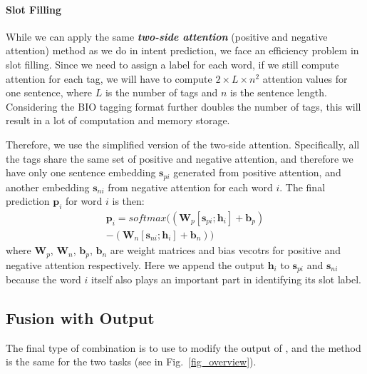 \paragraph{Slot Filling}
While we can apply the same \textbf{\emph{two-side attention}} (positive and negative attention) method as we do in intent prediction, we face an efficiency problem in slot filling. Since we need to assign a label for each word, if we still compute attention for each tag, we will have to compute $2\times L \times n^2$ attention values for one sentence, where $L$ is the number of tags and $n$ is the sentence length. Considering the BIO tagging format further doubles the number of tags, this will result in a lot of computation and memory storage. 

Therefore, we use the simplified version of the two-side attention. Specifically, all the tags share the same set of positive and negative attention, and therefore we have only one sentence embedding $\textbf{s}_{pi}$ generated from positive attention, and another embedding $\textbf{s}_{ni}$ from negative attention for each word $i$. The final prediction $\textbf{p}_i$ for word $i$ is then:
\begin{equation}
\begin{split}
\textbf{p}_i = softmax((\textbf{W}_p [\textbf{s}_{pi}; \textbf{h}_i] + \textbf{b}_p) \\- (\textbf{W}_n [\textbf{s}_{ni}; \textbf{h}_i] + \textbf{b}_n))
\end{split} 
\end{equation} 
where $\textbf{W}_{p}$, $\textbf{W}_{n}$, $\textbf{b}_{p}$, $\textbf{b}_{n}$ are weight matrices and bias vecotrs for positive and negative attention respectively. Here we append the \BLSTM output $\textbf{h}_i$ to $\textbf{s}_{pi}$ and $\textbf{s}_{ni}$ because the word $i$ itself also plays an important part in identifying its slot label.

\subsection{Fusion with Output}
\label{fusion_with_output}
The final type of combination is to use \RE to modify the output of \NN, and the method is the same for the two tasks (see  in Fig.~\ref{fig_overview}). 



